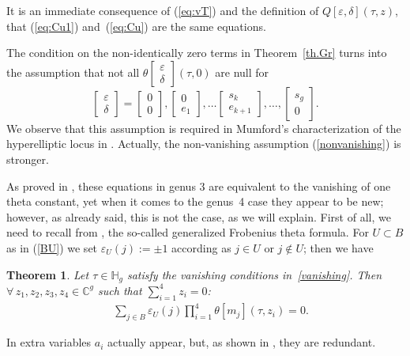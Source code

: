 \documentclass[pdftex]{sigma}
\numberwithin{equation}{section}
\newtheorem{Theorem}{Theorem}[section]
\newcommand{\de}{\delta}
\newcommand{\ep}{\varepsilon}
\newcommand{\CC}{{\mathbb{C}}}
\newcommand{\HH}{{\mathbb{H}}}
\begin{document}
It is an immediate consequence of (\ref{eq:vT}) and the definition of $ Q[\ep,\de](\tau, z)$, that (\ref{eq:Cu1}) and~(\ref{eq:Cu}) are the same equations.

The condition on the non-identically zero terms in Theorem~\ref{th.Gr} turns into the assumption that not all $\theta\left[\begin{smallmatrix}\ep \\ \de\end{smallmatrix}\right](\tau,0) $ are null for
 \[
 \begin{bmatrix} \ep \\ \de\end{bmatrix} =\begin{bmatrix} 0 \\ 0 \end{bmatrix} ,\begin{bmatrix} 0 \\ e_{1}\end{bmatrix}, \dots\begin{bmatrix} s_k \\ e_{k+1} \end{bmatrix},\dots,\begin{bmatrix} s_g \\ 0
\end{bmatrix}.
\]
We observe that this assumption is required in Mumford's characterization of the hyperelliptic locus in \cite{mu}. Actually, the non-vanishing assumption (\ref{nonvanishing}) is stronger.

As proved in \cite{Gr}, these equations in genus 3 are
equivalent to the vanishing of one theta constant, yet when it comes to the genus~4 case they appear to be new; however, as already said, this is not the case, as we will explain. First of all, we need to recall from \cite[Theorem~7.1]{mu}, the so-called generalized Frobenius theta formula. For $U\subset B$ as in (\ref{BU}) we set $\ep_U(j):= \pm1$ according as $j\in U$ or $j\notin U$; then we have

\begin{Theorem} Let $\tau\in\HH_g$ satisfy the vanishing conditions in~\eqref{vanishing}. Then $\forall\, z_1, z_2, z_3, z_4 \in\CC^g$ such that $ \sum\limits_{i=1}^4 z_i=0$:
\begin{gather}\label{eq:FR} \quad \sum_{j\in B} \ep_U(j)\prod_{i=1}^4\theta[m_j](\tau, z_i)=0 . \end{gather}
\end{Theorem}

In \cite{mu} extra variables $a_i$ actually appear, but, as shown in \cite{po}, they are redundant.
\end{document}
